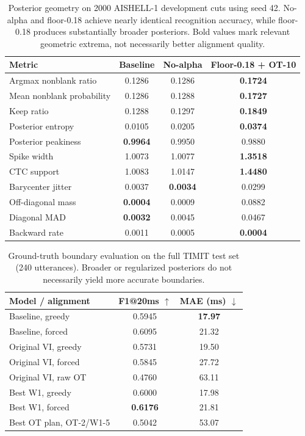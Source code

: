 \begin{table}[t]
  \centering
  \small
  \caption{Posterior geometry on 2000 AISHELL-1 development cuts using
  seed 42. No-alpha and floor-0.18 achieve nearly identical recognition
  accuracy, while floor-0.18 produces substantially broader posteriors.
  Bold values mark relevant geometric extrema, not necessarily better
  alignment quality.}
  \label{tab:aishell_geometry}
  \begin{tabular}{lccc}
    \toprule
    Metric & Baseline & No-alpha & Floor-0.18 + OT-10 \\
    \midrule
    Argmax nonblank ratio
      & 0.1286 & 0.1286 & \textbf{0.1724} \\
    Mean nonblank probability
      & 0.1286 & 0.1288 & \textbf{0.1727} \\
    Keep ratio
      & 0.1288 & 0.1297 & \textbf{0.1849} \\
    Posterior entropy
      & 0.0105 & 0.0205 & \textbf{0.0374} \\
    Posterior peakiness
      & \textbf{0.9964} & 0.9950 & 0.9880 \\
    Spike width
      & 1.0073 & 1.0077 & \textbf{1.3518} \\
    CTC support
      & 1.0083 & 1.0147 & \textbf{1.4480} \\
    Barycenter jitter
      & 0.0037 & \textbf{0.0034} & 0.0299 \\
    Off-diagonal mass
      & \textbf{0.0004} & 0.0009 & 0.0882 \\
    Diagonal MAD
      & \textbf{0.0032} & 0.0045 & 0.0467 \\
    Backward rate
      & 0.0011 & 0.0005 & \textbf{0.0004} \\
    \bottomrule
  \end{tabular}
\end{table}

\begin{table}[t]
  \centering
  \small
  \caption{Ground-truth boundary evaluation on the full TIMIT test set
  (240 utterances). Broader or regularized posteriors do not necessarily
  yield more accurate boundaries.}
  \label{tab:timit_boundaries}
  \begin{tabular}{lcc}
    \toprule
    Model / alignment & F1@20ms $\uparrow$ & MAE (ms) $\downarrow$ \\
    \midrule
    Baseline, greedy       & 0.5945 & \textbf{17.97} \\
    Baseline, forced       & 0.6095 & 21.32 \\
    Original VI, greedy    & 0.5731 & 19.50 \\
    Original VI, forced    & 0.5845 & 27.72 \\
    Original VI, raw OT    & 0.4760 & 63.11 \\
    Best W1, greedy        & 0.6000 & 17.98 \\
    Best W1, forced        & \textbf{0.6176} & 21.81 \\
    Best OT plan, OT-2/W1-5 & 0.5042 & 53.07 \\
    \bottomrule
  \end{tabular}
\end{table}

